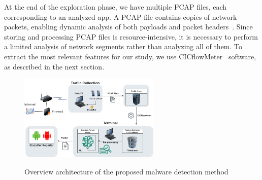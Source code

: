 At the end of the exploration phase, we have multiple PCAP files, each corresponding to an analyzed app. A PCAP file contains copies of network packets, enabling dynamic analysis of both payloads and packet headers~\cite{DBLP:conf/iv/UhlarHR21}. Since storing and processing PCAP files is resource-intensive, it is necessary to perform a limited analysis of network segments rather than analyzing all of them. To extract the most relevant features for our study, we use CICflowMeter~\cite{DBLP:conf/icissp/LashkariDMG17} software, as described in the next section.






\begin{figure}[h]
  \centering
  
    \includegraphics[width=0.60\textwidth]{image/archic.png} \\[\abovecaptionskip]
    
  \caption{Overview architecture of the proposed malware detection method}\label{fig:arq}
\end{figure}







